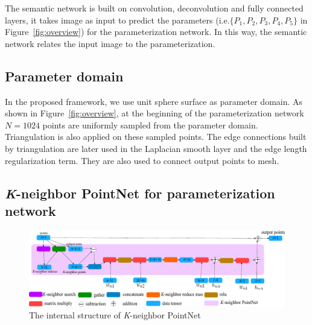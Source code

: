 The semantic network is built on convolution, deconvolution and fully connected layers, it takes image as input to predict the parameters (i.e.$\{P_1,P_2,P_3,P_4,P_5\}$ in Figure~\ref{fig:overview}) for the parameterization network. In this way, the semantic network relates the input image to the parameterization.
\subsection{Parameter domain}
In the proposed framework, we use unit sphere surface as parameter domain. As shown in Figure~\ref{fig:overview}, at the beginning of the parameterization network $N=1024$ points are uniformly sampled from the parameter domain. Triangulation is also applied on these sampled points. The edge connections built by triangulation are later used in the Laplacian smooth layer and the edge length regularization term. They are also used to connect output points to mesh.
\subsection{\textit{K}-neighbor PointNet for parameterization network} 
\label{subsec:k-n_point_net}

\begin{figure}[htbp]
	\centering
	\includegraphics[width=\linewidth]{img/net/k-n_pointnet}
	\caption{The internal structure of \textit{K}-neighbor PointNet}
	\label{fig:knpointnet}
\end{figure}

